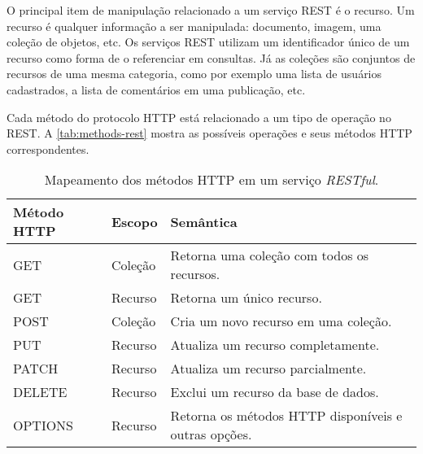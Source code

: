 O principal item de manipulação relacionado a um serviço REST é o recurso. Um recurso é qualquer informação a ser manipulada: documento, imagem, uma coleção de objetos, etc. Os serviços REST utilizam um identificador único de um recurso como forma de o referenciar em consultas. Já as coleções são conjuntos de recursos de uma mesma categoria, como por exemplo uma  lista de usuários cadastrados, a lista de comentários em uma publicação, etc.

Cada método do protocolo HTTP está relacionado a um tipo de operação no REST. A \autoref{tab:methods-rest} mostra as possíveis operações e seus métodos HTTP correspondentes.

\begin{table}[htb]
	\centering
	\caption{Mapeamento dos métodos HTTP em um serviço \textit{RESTful}.}
	\label{tab:methods-rest}
	\begin{tabular}{p{3.5cm}p{2cm}p{9cm}}
		\hline
		\textbf{Método HTTP} &
		\textbf{Escopo}      &
		\textbf{Semântica}                                   \\[5mm]

		\hline
		GET                  &
		Coleção              &
		Retorna uma coleção com todos os recursos.           \\[5mm]

		\hline
		GET                  &
		Recurso              &
		Retorna um único recurso.                            \\[5mm]

		\hline
		POST                 &
		Coleção              &
		Cria um novo recurso em uma coleção.                 \\[5mm]

		\hline
		PUT                  &
		Recurso              &
		Atualiza um recurso completamente.                   \\[5mm]

		\hline
		PATCH                &
		Recurso              &
		Atualiza um recurso parcialmente.                    \\[5mm]

		\hline
		DELETE               &
		Recurso              &
		Exclui um recurso da base de dados.                  \\[5mm]

		\hline
		OPTIONS              &
		Recurso              &
		Retorna os métodos HTTP disponíveis e outras opções. \\[5mm]

		\hline
	\end{tabular}
\end{table}

